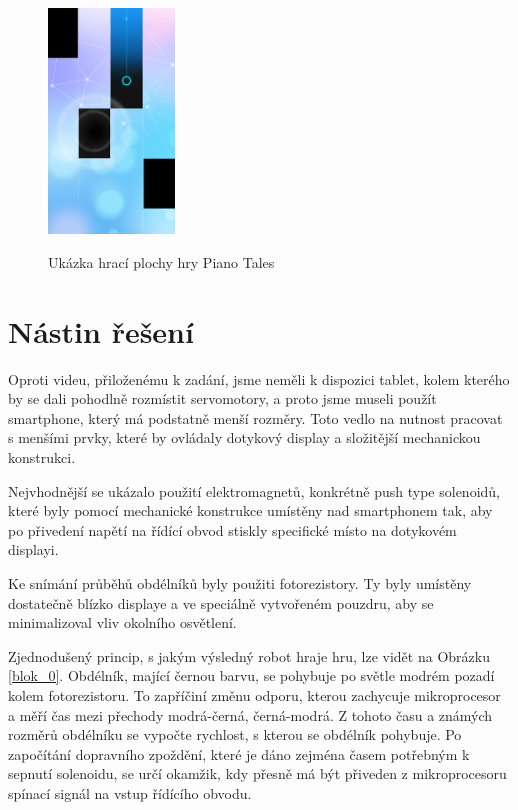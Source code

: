 \documentclass[12pt,oneside]{book} %
\begin{document}
\begin{figure}[ht] \large\centering
\includegraphics[width=0.30\textwidth]{./img/pianotales.png}\\[1cm] 
\caption{Ukázka hrací plochy hry Piano Tales}
\label{pianotales}
\end{figure}   
      
\section{Nástin řešení}\label{nastin}
\qquad Oproti videu, přiloženému k zadání, jsme neměli k dispozici tablet, kolem kterého by se dali pohodlně rozmístit servomotory, a proto jsme museli použít smartphone, který má podstatně menší rozměry. Toto vedlo na nutnost pracovat s menšími prvky, které by ovládaly dotykový display a složitější mechanickou konstrukci.

\qquad Nejvhodnější se ukázalo použití elektromagnetů, konkrétně push type solenoidů, které byly pomocí mechanické konstrukce umístěny nad smartphonem tak, aby po přivedení napětí na řídící obvod stiskly specifické místo na dotykovém displayi.

\qquad Ke snímání průběhů obdélníků byly použiti fotorezistory. Ty byly umístěny dostatečně blízko displaye a ve speciálně vytvořeném pouzdru, aby se minimalizoval vliv okolního osvětlení. 

\qquad Zjednodušený princip, s jakým výsledný robot hraje hru, lze vidět na Obrázku \ref{blok_0}. Obdélník, mající černou barvu, se pohybuje po světle modrém pozadí kolem fotorezistoru. To zapříčiní změnu odporu, kterou zachycuje mikroprocesor a měří čas mezi přechody modrá-černá, černá-modrá. Z tohoto času a známých rozměrů obdélníku se vypočte rychlost, s kterou se obdélník pohybuje. Po započítání dopravního zpoždění, které je dáno zejména časem potřebným k sepnutí solenoidu, se určí okamžik, kdy přesně má být přiveden z mikroprocesoru spínací signál na vstup řídícího obvodu.
\end{document}
